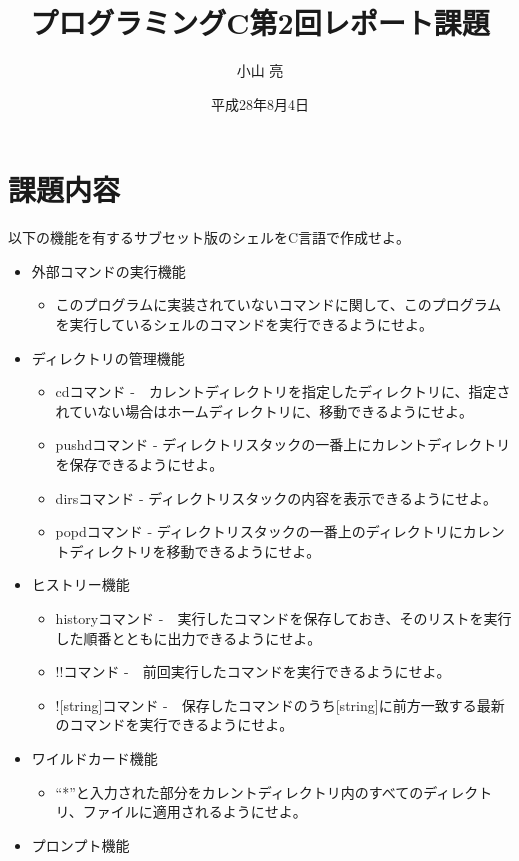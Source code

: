 \documentclass{procreport}
\title{プログラミングC第2回レポート課題}
\author{小山 亮}
\date{平成28年8月4日}
\begin{document}
\maketitle

\section{課題内容}
以下の機能を有するサブセット版のシェルをC言語で作成せよ。

\begin{itemize}
\item 外部コマンドの実行機能
\begin{itemize}
\item このプログラムに実装されていないコマンドに関して、このプログラムを実行しているシェルのコマンドを実行できるようにせよ。
\end{itemize}
\item ディレクトリの管理機能
\begin{itemize}
\item cdコマンド -　カレントディレクトリを指定したディレクトリに、指定されていない場合はホームディレクトリに、移動できるようにせよ。
\item pushdコマンド - ディレクトリスタックの一番上にカレントディレクトリを保存できるようにせよ。
\item dirsコマンド - ディレクトリスタックの内容を表示できるようにせよ。
\item popdコマンド - ディレクトリスタックの一番上のディレクトリにカレントディレクトリを移動できるようにせよ。
\end{itemize}
\item ヒストリー機能
\begin{itemize}
\item historyコマンド -　実行したコマンドを保存しておき、そのリストを実行した順番とともに出力できるようにせよ。
\item !!コマンド -　前回実行したコマンドを実行できるようにせよ。
\item ![string]コマンド -　保存したコマンドのうち[string]に前方一致する最新のコマンドを実行できるようにせよ。
\end{itemize}
\item ワイルドカード機能
\begin{itemize}
\item ``*''と入力された部分をカレントディレクトリ内のすべてのディレクトリ、ファイルに適用されるようにせよ。
\end{itemize}
\item プロンプト機能

\end{itemize}
\end{document}
